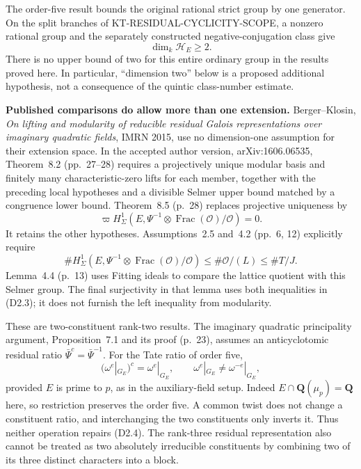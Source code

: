 \documentclass[11pt,a4paper]{article}
\theoremstyle{definition}
\renewcommand{\paragraph}[1]{\par\smallskip\noindent\textbf{#1}\quad\ignorespaces}
\begin{document}
The order-five result bounds the original rational strict group by
one generator.  On the split branches of
KT-RESIDUAL-CYCLICITY-SCOPE, a nonzero rational group and the
separately constructed negative-conjugation class give
\[
 \dim_k\mathcal H_E\geq2.                                      \tag{D2.1}
\]
There is no upper bound of two for this entire ordinary group in
the results proved here.  In particular, ``dimension two'' below
is a proposed additional hypothesis, not a consequence of the
quintic class-number estimate.

\paragraph{Published comparisons do allow more than one extension.}
Berger--Klosin, \emph{On lifting and modularity of reducible residual
Galois representations over imaginary quadratic fields}, IMRN 2015,
use no dimension-one assumption for their extension space.
In the accepted author version, arXiv:1606.06535, Theorem~8.2
(pp.~27--28) requires a projectively unique modular basis and
finitely many characteristic-zero lifts for each member, together
with the preceding local hypotheses and a divisible Selmer upper
bound matched by a congruence lower bound.  Theorem~8.5 (p.~28)
replaces projective uniqueness by
\[
 \varpi H^1_\Sigma
       (E,\Psi^{-1}\otimes\operatorname{Frac}(\mathcal O)/\mathcal O)
       =0.                                                     \tag{D2.2}
\]
It retains the other hypotheses.  Assumptions~2.5 and~4.2
(pp.~6, 12) explicitly require
\[
 \#H^1_\Sigma(E,\Psi^{-1}\otimes
              \operatorname{Frac}(\mathcal O)/\mathcal O)
       \leq\#\mathcal O/(L)\leq\#T/J.                          \tag{D2.3}
\]
Lemma~4.4 (p.~13) uses Fitting ideals to compare the lattice
quotient with this Selmer group.  The final surjectivity in that
lemma uses both inequalities in (D2.3); it does not furnish the
left inequality from modularity.

These are two-constituent rank-two results.  The imaginary
quadratic principality argument, Proposition~7.1 and its proof
(p.~23), assumes an anticyclotomic residual ratio
$\bar\Psi^c=\bar\Psi^{-1}$.  For the Tate ratio of order five,
\[
 (\omega^{e}|_{G_E})^c=\omega^{e}|_{G_E},
 \qquad \omega^{e}|_{G_E}\ne\omega^{-e}|_{G_E},                 \tag{D2.4}
\]
provided $E$ is prime to $p$, as in the auxiliary-field setup.
Indeed $E\cap\mathbf Q(\mu_p)=\mathbf Q$ here, so restriction
preserves the order five.  A common twist does not change a
constituent ratio, and interchanging the two constituents only
inverts it.  Thus neither operation repairs (D2.4).
The rank-three residual representation also cannot be treated as
two absolutely irreducible constituents by combining two of its
three distinct characters into a block.
\end{document}
